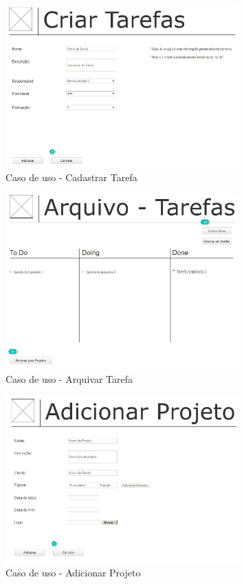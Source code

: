 \begin{figure}[H]
  \center
  \includegraphics[width=0.8\textwidth]{figuras/Prototipo6}
  \caption{Caso de uso - Cadastrar Tarefa}
  \label{fig:uc-cadastrar-tarefa}
\end{figure}

\begin{figure}[H]
  \center
  \includegraphics[width=0.8\textwidth]{figuras/Prototipo7}
  \caption{Caso de uso - Arquivar Tarefa}
  \label{fig: uc-arquivar-tarefa}
\end{figure}

\begin{figure}[H]
  \center
  \includegraphics[width=0.8\textwidth]{figuras/Prototipo8}
  \caption{Caso de uso - Adicionar Projeto}
  \label{fig:uc-adicionar-projeto}
\end{figure}

